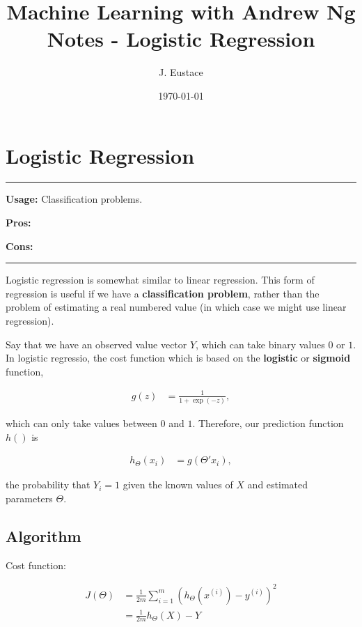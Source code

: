 \documentclass{article}
\begin{document}
\title{Machine Learning with Andrew Ng Notes - Logistic Regression}
\author{J. Eustace}
\date{\today}
\maketitle

\section{Logistic Regression}

\noindent\rule[0.5ex]{\linewidth}{1pt}

\textbf{Usage:} Classification problems.

\textbf{Pros:}

\textbf{Cons:}

\noindent\rule[0.5ex]{\linewidth}{1pt}

Logistic regression is somewhat similar to linear regression. This form of regression is useful if we have a \textbf{classification problem}, rather than the problem of estimating a real numbered value (in which case we might use linear regression). 

Say that we have an observed value vector $Y$, which can take binary values $0$ or $1$. In logistic regressio, the cost function which is based on the \textbf{logistic} or \textbf{sigmoid} function, 

\begin{align}
g(z) & = \frac{1}{1 + \exp(-z)},
\end{align}

\noindent
which can only take values between $0$ and $1$. Therefore, our prediction function $h()$ is

\begin{align}
h_\Theta(x_i) & = g(\Theta'x_i),
\end{align}

\noindent
the probability that $Y_i=1$ given the known values of $X$ and estimated parameters $\Theta$.


\subsection{Algorithm}

Cost function:

\begin{align}
J(\Theta) & = \frac{1}{2m} \sum_{i=1}^m (h_\Theta(x^{(i)}) - y^{(i)})^2 \\
		& = \frac{1}{2m} h_\Theta(X) - Y
\end{align}
\end{document}
